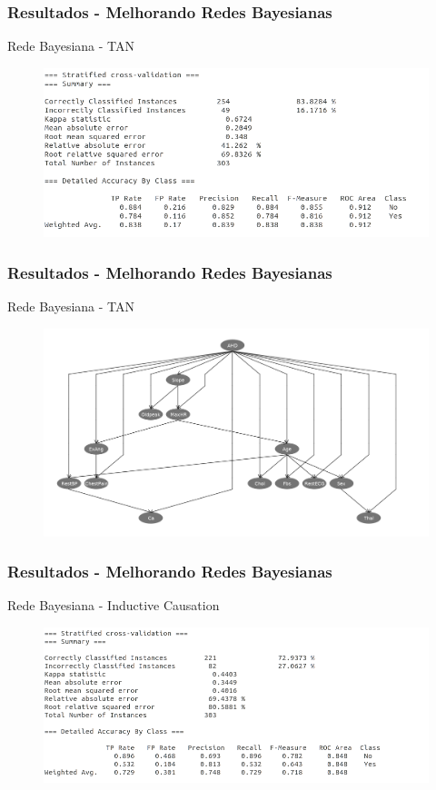 \documentclass{beamer}
\theoremstyle{theorem}
\theoremstyle{definition}
\begin{document}
\begin{frame}
\frametitle{Resultados - Melhorando Redes Bayesianas}
\begin{block}{Rede Bayesiana - TAN}
\end{block}
\begin{figure}[htbp]
	\includegraphics[scale=.35]{fig/BNAT-res.png}
\label{fig1}
\end{figure}
\end{frame}

\begin{frame}
\frametitle{Resultados - Melhorando Redes Bayesianas}
\begin{block}{Rede Bayesiana - TAN}
\end{block}
\begin{figure}[htbp]
	\includegraphics[scale=.21]{fig/BNAT-grafo.png}
\label{fig1}
\end{figure}
\end{frame}

\begin{frame}
\frametitle{Resultados - Melhorando Redes Bayesianas}
\begin{block}{Rede Bayesiana - Inductive Causation}
\end{block}
\begin{figure}[htbp]
	\includegraphics[scale=.35]{fig/BNIC-res.png}
\label{fig1}
\end{figure}
\end{frame}
\end{document}
